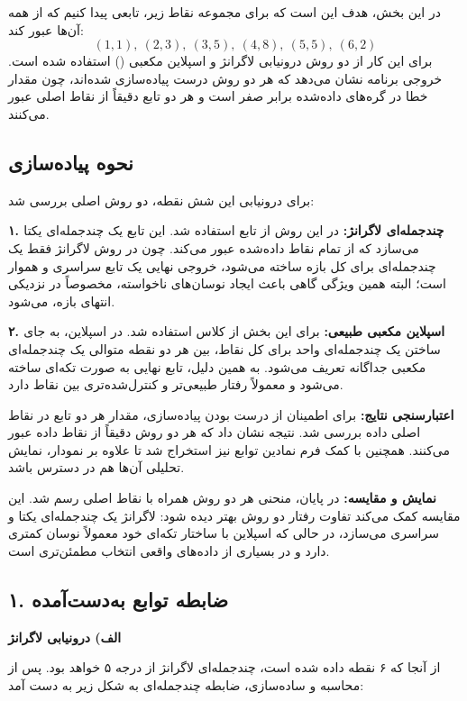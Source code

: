 \documentclass[12pt,a4paper]{article}
\begin{document}
	در این بخش، هدف این است که برای مجموعه نقاط زیر، تابعی پیدا کنیم که از همه آن‌ها عبور کند:
	\[
	(1,1),\ (2,3),\ (3,5),\ (4,8),\ (5,5),\ (6,2)
	\]
	برای این کار از دو روش درونیابی لاگرانژ و اسپلاین مکعبی
	()
	استفاده شده است. خروجی برنامه نشان می‌دهد که هر دو روش درست پیاده‌سازی شده‌اند، چون مقدار خطا در گره‌های داده‌شده برابر صفر است و هر دو تابع دقیقاً از نقاط اصلی عبور می‌کنند.
	
	\subsection*{نحوه پیاده‌سازی}
	
	برای درونیابی این شش نقطه، دو روش اصلی بررسی شد:
	
	\textbf{۱. چندجمله‌ای لاگرانژ:}
	در این روش از تابع
	استفاده شد. این تابع یک چندجمله‌ای یکتا می‌سازد که از تمام نقاط داده‌شده عبور می‌کند. چون در روش لاگرانژ فقط یک چندجمله‌ای برای کل بازه ساخته می‌شود، خروجی نهایی یک تابع سراسری و هموار است؛ البته همین ویژگی گاهی باعث ایجاد نوسان‌های ناخواسته، مخصوصاً در نزدیکی انتهای بازه، می‌شود.
	
	\textbf{۲. اسپلاین مکعبی طبیعی:}
	برای این بخش از کلاس
	استفاده شد. در اسپلاین، به جای ساختن یک چندجمله‌ای واحد برای کل نقاط، بین هر دو نقطه متوالی یک چندجمله‌ای مکعبی جداگانه تعریف می‌شود. به همین دلیل، تابع نهایی به صورت تکه‌ای ساخته می‌شود و معمولاً رفتار طبیعی‌تر و کنترل‌شده‌تری بین نقاط دارد.
	
	\textbf{اعتبارسنجی نتایج:}
	برای اطمینان از درست بودن پیاده‌سازی، مقدار هر دو تابع در نقاط اصلی داده بررسی شد. نتیجه نشان داد که هر دو روش دقیقاً از نقاط داده عبور می‌کنند. همچنین با کمک
	فرم نمادین توابع نیز استخراج شد تا علاوه بر نمودار، نمایش تحلیلی آن‌ها هم در دسترس باشد.
	
	\textbf{نمایش و مقایسه:}
	در پایان، منحنی هر دو روش همراه با نقاط اصلی رسم شد. این مقایسه کمک می‌کند تفاوت رفتار دو روش بهتر دیده شود: لاگرانژ یک چندجمله‌ای یکتا و سراسری می‌سازد، در حالی که اسپلاین با ساختار تکه‌ای خود معمولاً نوسان کمتری دارد و در بسیاری از داده‌های واقعی انتخاب مطمئن‌تری است.
	
	\subsection*{۱. ضابطه توابع به‌دست‌آمده}
	
	\textbf{الف) درونیابی لاگرانژ}
	
	از آنجا که ۶ نقطه داده شده است، چندجمله‌ای لاگرانژ از درجه ۵ خواهد بود. پس از محاسبه و ساده‌سازی، ضابطه چندجمله‌ای به شکل زیر به دست آمد:
	
\end{document}
